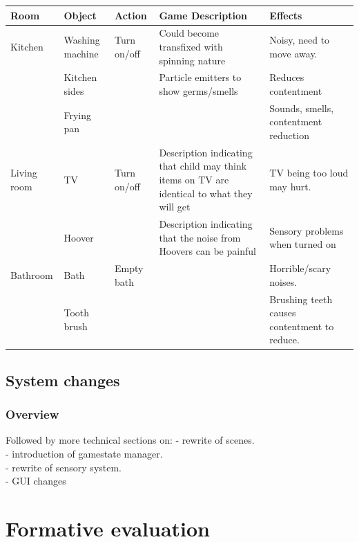 \documentclass[11pt]{report}
\begin{document}
\begin{table}[H]
    \begin{tabular}{| p{2cm} | p{2cm} | p{3cm} | p{3cm} | p{4cm} | }
    \hline
    Room & Object & Action & Game Description & Effects                                                                  \\
    \hline
    \hline
        Kitchen & Washing machine & Turn on/off & Could become transfixed with spinning nature & Noisy, need to move away. \\
    \hline
    & Kitchen sides & & Particle emitters to show germs/smells & Reduces contentment \\
    \hline
    & Frying pan & & & Sounds, smells, contentment reduction \\
    \hline
    Living room & TV & Turn on/off & Description indicating that child may think items on TV are identical to what they will get & TV being too loud may hurt. \\
    \hline
    & Hoover & & Description indicating that the noise from Hoovers can be painful & Sensory problems when turned on \\
    \hline
    Bathroom & Bath & Empty bath & & Horrible/scary noises. \\
    \hline
    & Tooth brush & & & Brushing teeth causes contentment to reduce. \\
    \hline
    \end{tabular}
\end{table}


\section{System changes}

\subsection{Overview}

Followed by more technical sections on:
- rewrite of scenes. \\
- introduction of gamestate manager. \\
- rewrite of sensory system. \\
- GUI changes \\

\chapter{Formative evaluation}
\end{document}
